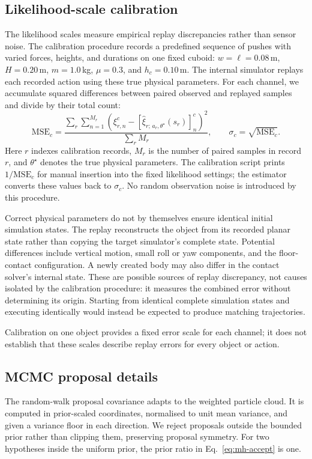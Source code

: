 \documentclass[12pt]{article}
\begin{document}
\subsection{Likelihood-scale calibration}\label{app:likelihood-calibration}
The likelihood scales measure empirical replay discrepancies rather than sensor noise. The calibration procedure records a predefined sequence of pushes with varied forces, heights, and durations on one fixed cuboid: $w=\ell=0.08$\,m, $H=0.20$\,m, $m=1.0$\,kg, $\mu=0.3$, and $h_c=0.10$\,m. The internal simulator replays each recorded action using these true physical parameters. For each channel, we accumulate squared differences between paired observed and replayed samples and divide by their total count:
\begin{equation}
\mathrm{MSE}_c=
\frac{\displaystyle\sum_r\sum_{n=1}^{M_r}
\left(\xi^c_{r,n}-[\hat{\xi}_{r;\,a_r,\theta^\star}(s_r)]^c_n\right)^2}
{\displaystyle\sum_r M_r},
\qquad \sigma_c=\sqrt{\mathrm{MSE}_c}.
\label{eq:likelihood-calibration}
\end{equation}
Here $r$ indexes calibration records, $M_r$ is the number of paired samples in record $r$, and $\theta^\star$ denotes the true physical parameters. The calibration script prints $1/\mathrm{MSE}_c$ for manual insertion into the fixed likelihood settings; the estimator converts these values back to $\sigma_c$. No random observation noise is introduced by this procedure.

Correct physical parameters do not by themselves ensure identical initial simulation states. The replay reconstructs the object from its recorded planar state rather than copying the target simulator's complete state. Potential differences include vertical motion, small roll or yaw components, and the floor-contact configuration. A newly created body may also differ in the contact solver's internal state. These are possible sources of replay discrepancy, not causes isolated by the calibration procedure: it measures the combined error without determining its origin. Starting from identical complete simulation states and executing identically would instead be expected to produce matching trajectories.

Calibration on one object provides a fixed error scale for each channel; it does not establish that these scales describe replay errors for every object or action.

\subsection{MCMC proposal details}\label{app:mcmc-proposals}
The random-walk proposal covariance adapts to the weighted particle cloud. It is computed in prior-scaled coordinates, normalised to unit mean variance, and given a variance floor in each direction. We reject proposals outside the bounded prior rather than clipping them, preserving proposal symmetry. For two hypotheses inside the uniform prior, the prior ratio in Eq.~\eqref{eq:mh-accept} is one.
\end{document}
